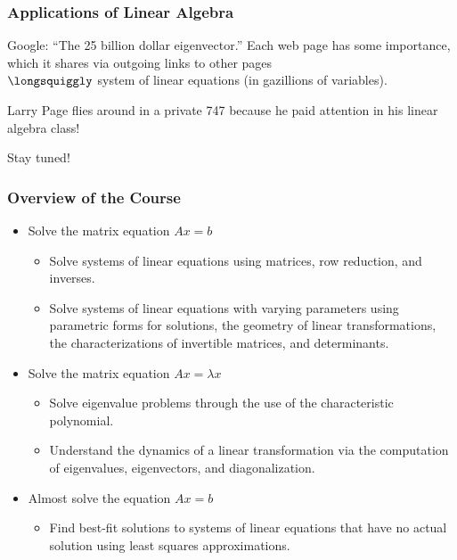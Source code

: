 
\begin{frame}
\frametitle{Applications of Linear Algebra}
\alert{Google:} ``The 25 billion dollar eigenvector.'' Each web page has some
importance, which it shares via outgoing links to other pages
\pause\\[1mm]
$\longsquiggly$ system of linear equations
\pause
(in gazillions of variables).

\pause
\vfill

Larry Page flies around in a private 747 because he paid attention in his
linear algebra class!

\vfill
\pause

Stay tuned!

\vfill

\end{frame}



\begin{frame}
\frametitle{Overview of the Course}

\begin{itemize}
\item<1-> Solve the matrix equation $Ax = b$
  \begin{itemize}
  \item<2-> \alert{Solve systems of linear equations} using matrices, row
    reduction, and inverses.
  \item<3-> \alert{Solve systems of linear equations with varying parameters}
    using parametric forms for solutions, the geometry of linear transformations,
    the characterizations of invertible matrices, and determinants.
  \end{itemize}
  \bigskip
\item<4-> Solve the matrix equation $Ax = \lambda x$
  \begin{itemize}
  \item<5-> \alert{Solve eigenvalue problems} through the use of the
    characteristic polynomial.
  \item<6-> \alert{Understand the dynamics of a linear transformation} via the
    computation of eigenvalues, eigenvectors, and diagonalization.
  \end{itemize}
  \bigskip
\item<7-> Almost solve the equation $Ax = b$
  \begin{itemize}
  \item<8->
    \alert{Find best-fit solutions to systems of linear equations that have no
      actual solution} using least squares approximations.
  \end{itemize}
\end{itemize}

\end{frame}


